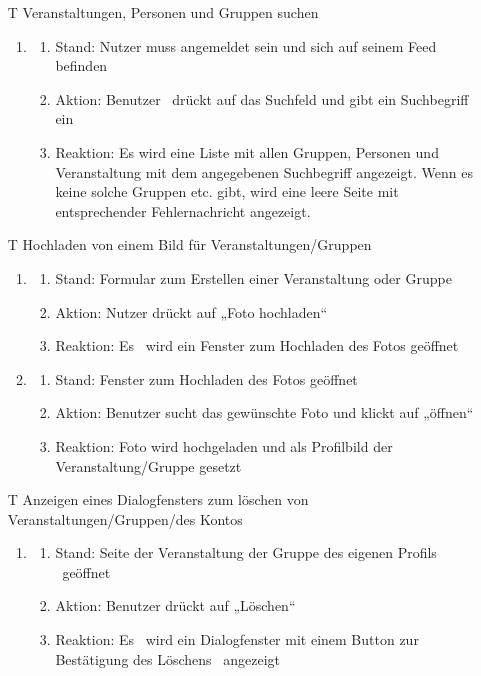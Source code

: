 \documentclass[parskip=full]{scrartcl}
\begin{document}
\begin{itemize}
\item[T] Veranstaltungen, Personen und Gruppen suchen
\begin{enumerate}
	\item
	\begin{enumerate}[nosep]	
	\item Stand: Nutzer muss angemeldet sein und sich auf seinem Feed befinden
	\item Aktion: Benutzer  drückt auf das Suchfeld und gibt ein Suchbegriff ein
	\item Reaktion: Es wird eine Liste mit allen Gruppen, Personen und Veranstaltung mit dem angegebenen Suchbegriff angezeigt. Wenn es keine solche Gruppen etc. gibt, wird eine leere Seite mit entsprechender Fehlernachricht angezeigt.
\end{enumerate} 
\end{enumerate}




\item[T]  Hochladen von einem Bild für Veranstaltungen/Gruppen
\begin{enumerate}
	\item
	\begin{enumerate}[nosep]	
	\item Stand: Formular zum Erstellen einer Veranstaltung oder Gruppe 
	\item Aktion: Nutzer drückt auf „Foto hochladen“
	\item Reaktion:  Es  wird ein Fenster zum Hochladen des Fotos geöffnet
\end{enumerate} 
\item
	\begin{enumerate}[nosep]	
	\item Stand: Fenster zum Hochladen des Fotos geöffnet
	\item Aktion: Benutzer sucht das gewünschte Foto und klickt auf „öffnen“
	\item Reaktion: Foto wird hochgeladen und als Profilbild der Veranstaltung/Gruppe gesetzt
\end{enumerate}
\end{enumerate}

\item[T] Anzeigen eines Dialogfensters zum löschen von Veranstaltungen/Gruppen/des Kontos
\begin{enumerate}
	\item
	\begin{enumerate}[nosep]	
	\item Stand:  Seite der Veranstaltung der Gruppe des eigenen Profils  geöffnet
	\item Aktion: Benutzer drückt auf „Löschen“
	\item Reaktion: Es  wird ein Dialogfenster mit einem Button zur Bestätigung des Löschens  angezeigt
\end{enumerate} 
\end{enumerate}


\end{itemize}
\end{document}
